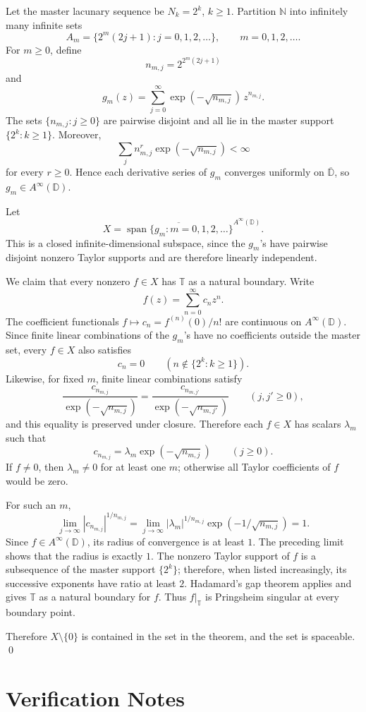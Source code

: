 \documentclass[11pt]{article}
\theoremstyle{remark}
\newcommand{\D}{\mathbb D}
\newcommand{\T}{\mathbb T}
\newcommand{\N}{\mathbb N}
\begin{document}
Let the master lacunary sequence be \(N_k=2^k\), \(k\ge 1\).  Partition
\(\N\) into infinitely many infinite sets
\[
A_m=\{2^m(2j+1): j=0,1,2,\ldots\},\qquad m=0,1,2,\ldots .
\]
For \(m\ge0\), define
\[
n_{m,j}=2^{2^m(2j+1)}
\]
and
\[
g_m(z)=\sum_{j=0}^{\infty}\exp(-\sqrt{n_{m,j}})\,z^{n_{m,j}}.
\]
The sets \(\{n_{m,j}:j\ge0\}\) are pairwise disjoint and all lie in the
master support \(\{2^k:k\ge1\}\).  Moreover,
\[
\sum_j n_{m,j}^r \exp(-\sqrt{n_{m,j}})<\infty
\]
for every \(r\ge0\).  Hence each derivative series of \(g_m\) converges
uniformly on \(\overline{\D}\), so \(g_m\in A^\infty(\D)\).

Let
\[
X=\overline{\operatorname{span}\{g_m:m=0,1,2,\ldots\}}^{A^\infty(\D)}.
\]
This is a closed infinite-dimensional subspace, since the \(g_m\)'s have
pairwise disjoint nonzero Taylor supports and are therefore linearly
independent.

We claim that every nonzero \(f\in X\) has \(\T\) as a natural boundary.
Write
\[
f(z)=\sum_{n=0}^{\infty} c_n z^n .
\]
The coefficient functionals \(f\mapsto c_n=f^{(n)}(0)/n!\) are continuous on
\(A^\infty(\D)\).  Since finite linear combinations of the \(g_m\)'s have no
coefficients outside the master set, every \(f\in X\) also satisfies
\[
c_n=0\qquad(n\notin\{2^k:k\ge1\}).
\]
Likewise, for fixed \(m\), finite linear combinations satisfy
\[
\frac{c_{n_{m,j}}}{\exp(-\sqrt{n_{m,j}})}
=
\frac{c_{n_{m,j'}}}{\exp(-\sqrt{n_{m,j'}})}
\qquad(j,j'\ge0),
\]
and this equality is preserved under closure.  Therefore each \(f\in X\)
has scalars \(\lambda_m\) such that
\[
c_{n_{m,j}}=\lambda_m\exp(-\sqrt{n_{m,j}})\qquad(j\ge0).
\]
If \(f\ne0\), then \(\lambda_m\ne0\) for at least one \(m\); otherwise all
Taylor coefficients of \(f\) would be zero.

For such an \(m\),
\[
\lim_{j\to\infty}
|c_{n_{m,j}}|^{1/n_{m,j}}
=
\lim_{j\to\infty}
|\lambda_m|^{1/n_{m,j}}\exp(-1/\sqrt{n_{m,j}})
=1.
\]
Since \(f\in A^\infty(\D)\), its radius of convergence is at least \(1\).
The preceding limit shows that the radius is exactly \(1\).  The nonzero
Taylor support of \(f\) is a subsequence of the master support \(\{2^k\}\);
therefore, when listed increasingly, its successive exponents have ratio at
least \(2\).  Hadamard's gap theorem applies and gives \(\T\) as a natural
boundary for \(f\).  Thus \(f|_{\T}\) is Pringsheim singular at every
boundary point.

Therefore \(X\setminus\{0\}\) is contained in the set in the theorem, and
the set is spaceable.
\qed

\section{Verification Notes}
\end{document}
